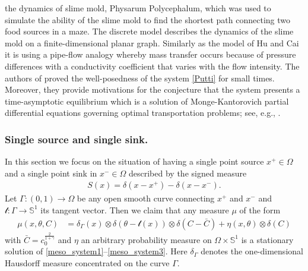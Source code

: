 \documentclass{article}
\numberwithin{equation}{section}
\def\[{\begin{eqnarray*}}
\def\]{\end{eqnarray*}}
\begin{document}
the dynamics of slime mold, Physarum Polycephalum, which was used to simulate the
ability of the slime mold to find the shortest path connecting two food sources in a maze. The discrete model
describes the dynamics of the slime mold on a finite-dimensional planar graph. Similarly as the model of
Hu and Cai \cite{hu2013adaptation} it is using a pipe-flow analogy whereby mass transfer occurs because of pressure differences
with a conductivity coefficient that varies with the flow intensity.
The authors of \cite{facca2018towards} proved the well-posedness of the system \eqref{Putti} for small times.
Moreover, they provide motivations for the conjecture that the system presents a time-asymptotic equilibrium which
is a solution of Monge-Kantorovich partial differential equations governing optimal transportation problems;
see, e.g., \cite{evans1999differential, ambrosio2003lecture}.



\subsubsection{Single source and single sink.}\label{ssec:singlesourcesink}
In this section we focus on the situation of having a single point source $x^+\in\Omega$ and a single point sink in $x^-\in\Omega$ described by
the signed measure
\[
   S(x) =\delta(x-{x^+}) - \delta(x-{x^-}).
\]
Let $\Gamma: (0,1) \to \Omega$ be any open smooth curve connecting $x^+$ and $x^-$
and $\mathcal{t}: \Gamma \to \mathbb{S}^1$ its tangent vector.
Then we claim that any measure $\mu$ of the form
\begin{align} \label{ansatz2}
   \mu(x,\theta,C) &= \delta_\Gamma(x) \otimes \delta(\theta-\mathcal{t}(x)) \otimes \delta(C-\bar C) +\eta (x, \theta ) \otimes \delta(C)
\end{align}
with $\bar{C}=c_0^{\frac{2}{1+\gamma}}$ and $\eta$ an arbitrary probability measure on $\Omega\times\mathbb{S}^1$
is a stationary solution of \eqref{meso_system1}--\eqref{meso_system3}.
Here $\delta_\Gamma$ denotes the one-dimensional Hausdorff measure concentrated on the curve $\Gamma$.
\end{document}
